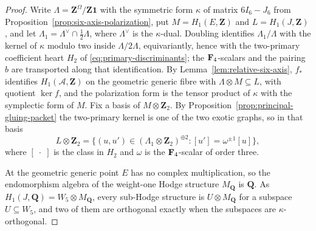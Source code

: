 \begin{proof}
Write \(\Lambda=\mathbf Z^\Omega/\mathbf Z\mathbf1\) with the symmetric form
\(\kappa\) of matrix \(6I_6-J_6\) from
Proposition~\ref{prop:six-axis-polarization}, put \(M=H_1(E,\mathbf Z)\) and
\(L=H_1(J,\mathbf Z)\), and let \(\Lambda_1=\Lambda^\vee\cap\tfrac12\Lambda\),
where \(\Lambda^\vee\) is the \(\kappa\)-dual.  Doubling identifies
\(\Lambda_1/\Lambda\) with the kernel of \(\kappa\) modulo two inside
\(\Lambda/2\Lambda\), equivariantly, hence with the two-primary coefficient
heart \(H_2\) of \eqref{eq:primary-discriminants}; the \(\mathbf F_4\)-scalars and
the pairing \(b\) are transported along that identification.  By
Lemma~\ref{lem:relative-six-axis}, \(f_*\) identifies
\(H_1(\mathcal A,\mathbf Z)\) on the geometric generic fibre with
\(\Lambda\otimes M\subseteq L\), with quotient \(\ker f\), and the
polarization form is the tensor product of \(\kappa\) with the symplectic form
of \(M\).  Fix a basis of \(M\otimes\mathbf Z_2\).  By
Proposition~\ref{prop:principal-gluing-packet} the two-primary kernel is one
of the two exotic graphs, so in that basis
\[
 L\otimes\mathbf Z_2
 =\bigl\{(u,u')\in(\Lambda_1\otimes\mathbf Z_2)^{\oplus2}:
   [u']=\omega^{\pm1}[u]\bigr\},
\]
where \([\;\cdot\;]\) is the class in \(H_2\) and \(\omega\) is the
\(\mathbf F_4\)-scalar of order three.

At the geometric generic point \(E\) has no complex multiplication, so the
endomorphism algebra of the weight-one Hodge structure \(M_{\mathbf Q}\) is
\(\mathbf Q\).  As \(H_1(J,\mathbf Q)=W_5\otimes M_{\mathbf Q}\), every
sub-Hodge structure is \(U\otimes M_{\mathbf Q}\) for a subspace
\(U\subseteq W_5\), and two of them are orthogonal exactly when the subspaces
are \(\kappa\)-orthogonal.


\end{proof}
